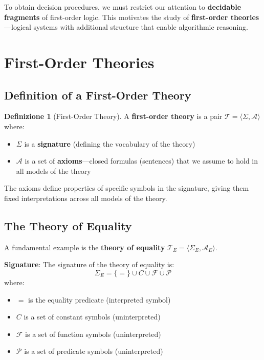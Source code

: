\documentclass[11pt,a4paper]{article}
\theoremstyle{definition}
\newtheorem{definition}{Definizione}[section]
\theoremstyle{plain}
\theoremstyle{remark}
\begin{document}
To obtain decision procedures, we must restrict our attention to \textbf{decidable fragments} of first-order logic. This motivates the study of \textbf{first-order theories}---logical systems with additional structure that enable algorithmic reasoning.

\section{First-Order Theories}

\subsection{Definition of a First-Order Theory}

\begin{definition}[First-Order Theory]
A \textbf{first-order theory} is a pair $\mathcal{T} = \langle \Sigma, \mathcal{A} \rangle$ where:
\begin{itemize}
    \item $\Sigma$ is a \textbf{signature} (defining the vocabulary of the theory)
    \item $\mathcal{A}$ is a set of \textbf{axioms}---closed formulas (sentences) that we assume to hold in all models of the theory
\end{itemize}
\end{definition}

The axioms define properties of specific symbols in the signature, giving them fixed interpretations across all models of the theory.

\subsection{The Theory of Equality}

A fundamental example is the \textbf{theory of equality} $\mathcal{T}_E = \langle \Sigma_E, \mathcal{A}_E \rangle$.

\textbf{Signature}: The signature of the theory of equality is:
\[
\Sigma_E = \{=\} \cup C \cup \mathcal{F} \cup \mathcal{P}
\]
where:
\begin{itemize}
    \item $=$ is the equality predicate (interpreted symbol)
    \item $C$ is a set of constant symbols (uninterpreted)
    \item $\mathcal{F}$ is a set of function symbols (uninterpreted)
    \item $\mathcal{P}$ is a set of predicate symbols (uninterpreted)
\end{itemize}
\end{document}
